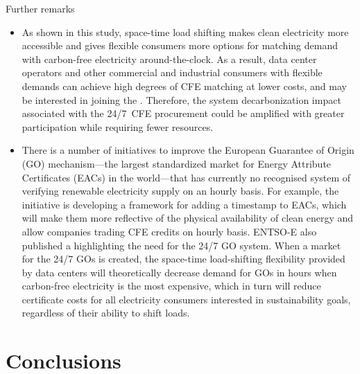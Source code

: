 \begin{frame}{Further remarks}
\label{ssec:remarks}

  {\footnotesize 

  \begin{itemize}

  \item As shown in this study, space-time load shifting makes clean electricity more accessible and gives flexible consumers more options for matching demand with carbon-free electricity around-the-clock. As a result, data center operators and other commercial and industrial consumers with flexible demands can \alert{achieve high degrees of CFE matching at lower costs}, and may be interested in joining the . Therefore, the system decarbonization impact associated with the 24/7~CFE procurement could be amplified with \alert{greater participation} while requiring \alert{fewer resources}. 
  
  \item There is a number of initiatives to improve the European Guarantee of Origin (GO) mechanism---the largest standardized market for Energy Attribute Certificates (EACs) in the world---that has currently no recognised system of verifying renewable electricity supply on an hourly basis. For example, the  initiative is developing a framework for adding a timestamp to EACs, which will make them more reflective of the physical availability of clean energy and allow companies trading CFE credits on hourly basis. ENTSO-E also published a  highlighting the need for the 24/7 GO system. When a market for the 24/7 GOs is created, the space-time load-shifting flexibility provided by data centers will theoretically decrease demand for GOs in hours when carbon-free electricity is the most expensive, which in turn will reduce  certificate costs for \alert{all electricity consumers} interested in sustainability goals, \alert{regardless of their ability to shift loads}.
  
  \end{itemize}
  }

\end{frame}


\section{Conclusions}


